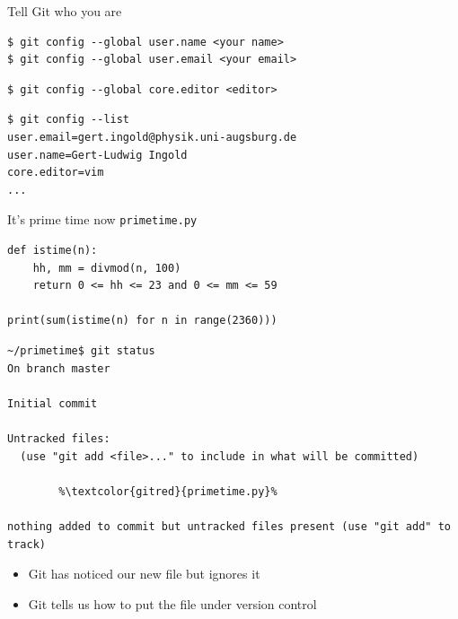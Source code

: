 \documentclass[svgnames]{beamer}
\begin{document}
\begin{frame}[fragile]{Tell Git who you are}

 \begin{lstlisting}
$ git config --global user.name <your name>
$ git config --global user.email <your email>
 \end{lstlisting}

 \vspace{\baselineskip}
 \begin{lstlisting}
$ git config --global core.editor <editor>
 \end{lstlisting}

 \vspace{\baselineskip}
 \begin{lstlisting}
$ git config --list
user.email=gert.ingold@physik.uni-augsburg.de
user.name=Gert-Ludwig Ingold
core.editor=vim
...
 \end{lstlisting}
\end{frame}

\begin{frame}[fragile]{It's prime time now}
 \texttt{primetime.py}
 \begin{lstlisting}
def istime(n):
    hh, mm = divmod(n, 100)
    return 0 <= hh <= 23 and 0 <= mm <= 59

print(sum(istime(n) for n in range(2360)))
 \end{lstlisting}

 \vspace{0.2truecm}
 \begin{lstlisting}[breaklines=true
                    ,escapechar=\%]
~/primetime$ git status
On branch master

Initial commit

Untracked files:
  (use "git add <file>..." to include in what will be committed)

        %\textcolor{gitred}{primetime.py}%

nothing added to commit but untracked files present (use "git add" to track)
 \end{lstlisting}
 \begin{itemize}
  \item Git has noticed our new file but ignores it
  \item Git tells us how to put the file under version control
 \end{itemize}
\end{frame}
\end{document}

